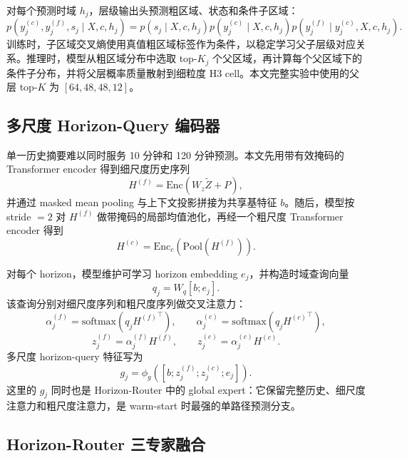 对每个预测时域 $h_j$，层级输出头预测粗区域、状态和条件子区域：
\begin{equation}
p(y_j^{(c)}, y_j^{(f)}, s_j \mid X,c,h_j)
=
p(s_j \mid X,c,h_j)
p(y_j^{(c)} \mid X,c,h_j)
p(y_j^{(f)} \mid y_j^{(c)},X,c,h_j).
\end{equation}
训练时，子区域交叉熵使用真值粗区域标签作为条件，以稳定学习父子层级对应关系。推理时，模型从粗区域分布中选取 top-$K_j$ 个父区域，再计算每个父区域下的条件子分布，并将父层概率质量散射到细粒度 H3 cell。本文完整实验中使用的父层 top-$K$ 为 $[64,48,48,12]$。

\subsection{多尺度 Horizon-Query 编码器}

单一历史摘要难以同时服务 10 分钟和 120 分钟预测。本文先用带有效掩码的 Transformer encoder 得到细尺度历史序列
\begin{equation}
H^{(f)}=\mathrm{Enc}(W_z\tilde{Z}+P),
\end{equation}
并通过 masked mean pooling 与上下文投影拼接为共享基特征 $b$。随后，模型按 stride $=2$ 对 $H^{(f)}$ 做带掩码的局部均值池化，再经一个粗尺度 Transformer encoder 得到
\begin{equation}
H^{(c)} = \mathrm{Enc}_{c}(\mathrm{Pool}(H^{(f)})).
\end{equation}

对每个 horizon，模型维护可学习 horizon embedding $e_j$，并构造时域查询向量
\begin{equation}
q_j = W_q[b;e_j].
\end{equation}
该查询分别对细尺度序列和粗尺度序列做交叉注意力：
\begin{equation}
\alpha_j^{(f)}=\mathrm{softmax}(q_j {H^{(f)}}^\top),\qquad
\alpha_j^{(c)}=\mathrm{softmax}(q_j {H^{(c)}}^\top),
\end{equation}
\begin{equation}
z_j^{(f)}=\alpha_j^{(f)}H^{(f)},\qquad
z_j^{(c)}=\alpha_j^{(c)}H^{(c)}.
\end{equation}
多尺度 horizon-query 特征写为
\begin{equation}
g_j=\phi_g([b;z_j^{(f)};z_j^{(c)};e_j]).
\end{equation}
这里的 $g_j$ 同时也是 Horizon-Router 中的 global expert：它保留完整历史、细尺度注意力和粗尺度注意力，是 warm-start 时最强的单路径预测分支。

\subsection{Horizon-Router 三专家融合}


